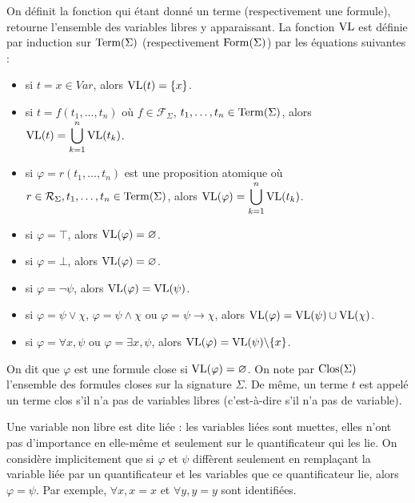 \begin{definition}
  On définit la fonction qui étant donné un terme (respectivement une formule),
  retourne l'ensemble des variables libres y apparaissant. La fonction $\operatorname{VL}$ est
  définie par induction sur $\operatorname{Term}(\Sigma)$ (respectivement $\operatorname{Form}(\Sigma)$)
  par les équations suivantes :
  \begin{itemize}
  \item si $t = x\in Var$, alors $\operatorname{VL}(t) = \{x\}$.
  \item si $t = f(t_1,\ldots,t_n)$ où $f\in \mathcal F_\Sigma$,
    $t_1,\ldots,t_n\in\operatorname{Term}(\Sigma)$, alors
    $\displaystyle\operatorname{VL}(t) =\bigcup_{k = 1}^n \operatorname{VL}(t_k)$.
  \item si $\varphi = r(t_1,\ldots,t_n)$ est une proposition atomique où
    $r\in\mathcal R_\Sigma, t_1,\ldots,t_n\in\operatorname{Term}(\Sigma)$, alors
    $\displaystyle\operatorname{VL}(\varphi) = \bigcup_{k = 1}^n \operatorname{VL}(t_k)$.
  \item si $\varphi = \top$, alors $\operatorname{VL}(\varphi) = \varnothing$.
  \item si $\varphi = \bot$, alors $\operatorname{VL}(\varphi) = \varnothing$.
  \item si $\varphi = \lnot \psi$, alors $\operatorname{VL}(\varphi) = \operatorname{VL}(\psi)$.
  \item si $\varphi = \psi\lor\chi$, $\varphi = \psi\land \chi$ ou
    $\varphi = \psi\to\chi$, alors $\operatorname{VL}(\varphi) = \operatorname{VL}(\psi)\cup\operatorname{VL}(\chi)$.
  \item si $\varphi = \forall x, \psi$ ou $\varphi = \exists x, \psi$, alors
    $\operatorname{VL}(\varphi) = \operatorname{VL}(\psi)\backslash\{x\}$.
  \end{itemize}
  On dit que $\varphi$ est une formule close si $\operatorname{VL}(\varphi) =\varnothing$.
  On note par $\operatorname{Clos}(\Sigma)$ l'ensemble des formules closes sur la signature
  $\Sigma$. De même, un terme $t$ est appelé un terme clos s'il n'a pas de
  variables libres (c'est-à-dire s'il n'a pas de variable).
\end{definition}

\begin{remark}\label{rmk.alpha}
  Une variable non libre est dite liée : les variables liées sont muettes, elles
  n'ont pas d'importance en elle-même et seulement sur le quantificateur qui les
  lie. On considère implicitement que si $\varphi$ et $\psi$ diffèrent seulement
  en remplaçant la variable liée par un quantificateur et les variables que ce
  quantificateur lie, alors $\varphi = \psi$. Par exemple, $\forall x, x = x$ et
  $\forall y, y = y$ sont identifiées.
\end{remark}

